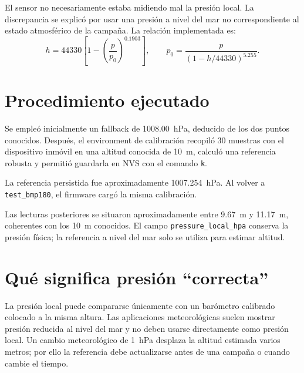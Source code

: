 \documentclass[11pt,a4paper,oneside]{report}
\begin{document}

El sensor no necesariamente estaba midiendo mal la presión local. La discrepancia se
explicó por usar una presión a nivel del mar no correspondiente al estado atmosférico
de la campaña. La relación implementada es:
\[
h=44330\left[1-\left(\frac{p}{p_0}\right)^{0.1903}\right],
\qquad
p_0=\frac{p}{\left(1-h/44330\right)^{5.255}}.
\]

\section{Procedimiento ejecutado}
Se empleó inicialmente un fallback de \SI{1008.00}{\hecto\pascal}, deducido de los
dos puntos conocidos. Después, el environment de calibración recopiló 30 muestras con
el dispositivo inmóvil en una altitud conocida de \SI{10}{\meter}, calculó una
referencia robusta y permitió guardarla en NVS con el comando \texttt{k}.


La referencia persistida fue aproximadamente \SI{1007.254}{\hecto\pascal}. Al volver
a \texttt{test\_bmp180}, el firmware cargó la misma calibración.


\begin{vsevidence}
Las lecturas posteriores se situaron aproximadamente entre \SI{9.67}{\meter} y
\SI{11.17}{\meter}, coherentes con los \SI{10}{\meter} conocidos. El campo
\texttt{pressure\_local\_hpa} conserva la presión física; la referencia a nivel del mar
solo se utiliza para estimar altitud.
\end{vsevidence}

\section{Qué significa presión ``correcta''}
La presión local puede compararse únicamente con un barómetro calibrado colocado a la
misma altura. Las aplicaciones meteorológicas suelen mostrar presión reducida al nivel
del mar y no deben usarse directamente como presión local. Un cambio meteorológico de
\SI{1}{\hecto\pascal} desplaza la altitud estimada varios metros; por ello la referencia
debe actualizarse antes de una campaña o cuando cambie el tiempo.
\end{document}
